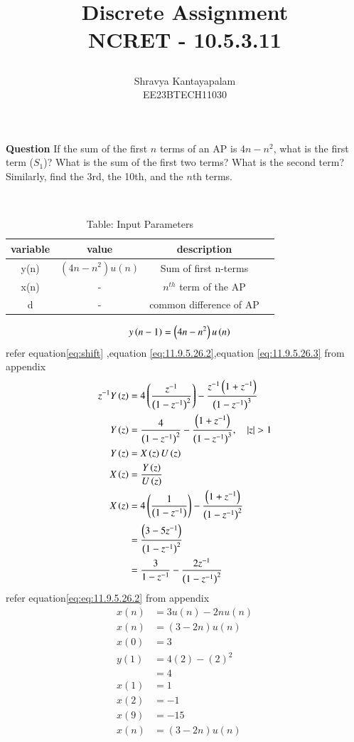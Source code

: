 \documentclass[a4,12pt,onecolumn]{IEEEtran}
\begin{document}
\title{
\Huge\textbf{ Discrete Assignment} \\
\textbf{NCRET - 10.5.3.11}
\author{Shravya Kantayapalam \\EE23BTECH11030}}
\maketitle
\textbf{Question} 
 If the sum of the first $ n $ terms of an AP is $4n - n^2$, what is the first term ($ S_1 $)? What is the sum of the first two terms? What is the second term? Similarly, find the 3rd, the 10th, and the $n$th terms.
 
\solution\\
\fi
\begin{table}[ht!]
\begin{center}
\begin{tabular}{|c|c|c|c|}
   \hline
   variable&value&description\\
   \hline 
   y(n)&$(4n-n^2)u(n)$& Sum of first n-terms\\
   \hline
   x(n)&-&$n^{th}$ term of the AP\\
   \hline 
   d&-&common difference of AP\\
   \hline
\end{tabular}
\caption{Table: Input Parameters}
\end{center}
\end{table}
\begin{align}
y\left(n-1\right)&=\left(4n-n^2\right)u\left(n\right)
\end{align}
refer equation\eqref{eq:shift} ,equation \eqref{eq:11.9.5.26.2},equation \eqref{eq:11.9.5.26.3} from appendix
\begin{align}
z^{-1}Y\brak{z} &=4\brak{\frac{z^{-1}}{\brak{1-z^{-1}}^2}}-\frac{z^{-1}\brak{1+z^{-1}}}{\brak{1-z^{-1}}^3}\\
Y\brak{z} &=\frac{4}{\brak{1-z^{-1}}^2}-\frac{\brak{1+z^{-1}}}{\brak{1-z^{-1}}^3},\quad{|z|>1}\\
Y\brak{z}&=X\brak{z}U\brak{z}\\
X\brak{z}&=\frac{Y\brak{z}}{U\brak{z}}\\
X\brak{z}&=4\brak{\frac{1}{\brak{1-z^{-1}}}}-\frac{\brak{1+z^{-1}}}{\brak{1-z^{-1}}^2}\\
&=\frac{\brak{3-5z^{-1}}}{\brak{1-z^{-1}}^2}\\
&=\frac{3}{1-z^{-1}}-\frac{2z^{-1}}{\brak{1-z^{-1}}^2}
\end{align}
refer equation\eqref{eq:eq:11.9.5.26.2} from appendix
\begin{align}
    x(n)&=3u(n)-2nu(n)\\
    x(n)&=(3-2n)u(n)\\
    x(0) &=3\\
   y(1) &= 4(2) - (2)^2\\
    &=4\\
x(1) &= 1 \\
x(2) &= -1 \\
x(9) &= -15 \\
x(n)&=(3-2n)u(n)
\end{align}
\end{document}
